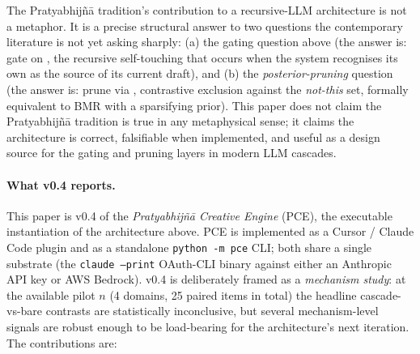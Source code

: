The Pratyabhij\~n\=a tradition's contribution to a recursive-LLM architecture is not a metaphor. It is a precise structural answer to two questions the contemporary literature is not yet asking sharply: (a) the gating question above (the answer is: gate on , the recursive self-touching that occurs when the system recognises its own  as the source of its current draft), and (b) the \emph{posterior-pruning} question (the answer is: prune via , contrastive exclusion against the \emph{not-this} set, formally equivalent to BMR with a sparsifying prior). This paper does not claim the Pratyabhij\~n\=a tradition is true in any metaphysical sense; it claims the architecture is correct, falsifiable when implemented, and useful as a design source for the gating and pruning layers in modern LLM cascades.

\paragraph{What v0.4 reports.} This paper is v0.4 of the \emph{Pratyabhij\~n\=a Creative Engine} (PCE), the executable instantiation of the architecture above. PCE is implemented as a Cursor / Claude Code plugin and as a standalone \texttt{python -m pce} CLI; both share a single substrate (the \texttt{claude --print} OAuth-CLI binary against either an Anthropic API key or AWS Bedrock). v0.4 is deliberately framed as a \emph{mechanism study}: at the available pilot $n$ (4 domains, 25 paired items in total) the headline cascade-vs-bare contrasts are statistically inconclusive, but several mechanism-level signals are robust enough to be load-bearing for the architecture's next iteration. The contributions are:

